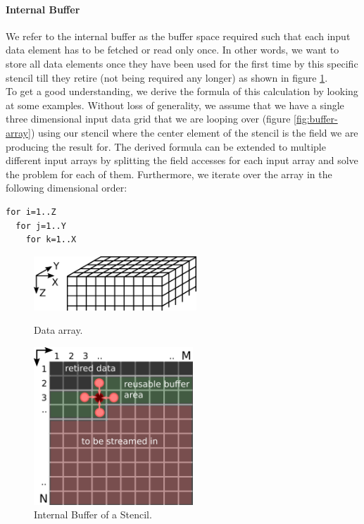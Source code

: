 \paragraph{Internal Buffer} \label{para:internal-buffer}
We refer to the internal buffer as the buffer space required such that each input data element has to be fetched or read only once. In other words, we want to store all data elements once they have been used for the first time by this specific stencil till they retire (not being required any longer) as shown in figure \ref{fig:model-internal-buffer}. \\
To get a good understanding, we derive the formula of this calculation by looking at some examples. Without loss of generality, we assume that we have a single three dimensional input data grid that we are looping over (figure \ref{fig:buffer-array}) using our stencil where the center element of the stencil is the field we are producing the result for. The derived formula can be extended to multiple different input arrays by splitting the field accesses for each input array and solve the problem for each of them. Furthermore, we iterate over the array in the following dimensional order:
\begin{verbatim}
for i=1..Z
  for j=1..Y
    for k=1..X
\end{verbatim}


\begin{figure}[h]
	\begin{minipage}{.5\columnwidth}
	\centering
	\includegraphics[height=5.5em]{drawings/buffer-array.png}
	\caption{Data array.}
	\label{fig:buffer-array}
	\vspace{-10.5em}
	\end{minipage}
	\begin{minipage}{.5\columnwidth}
	\centering
	\includegraphics[height=16em]{drawings/model-internal-buffer.png}
	\caption{Internal Buffer of a Stencil.}
	\label{fig:model-internal-buffer}
	\end{minipage}
\end{figure}


